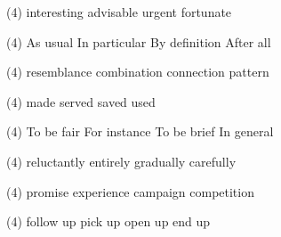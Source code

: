 \begin{tasks}(4)
	\task interesting
	\task advisable
	\task urgent
	\task fortunate
\end{tasks}
\item
\begin{tasks}(4)
	\task As usual
	\task In particular
	\task By definition
	\task After all
\end{tasks}
\item
\begin{tasks}(4)
	\task resemblance
	\task combination
	\task connection
	\task pattern
\end{tasks}
\item
\begin{tasks}(4)
	\task made
	\task served
	\task saved
	\task used
\end{tasks}
\item
\begin{tasks}(4)
	\task To be fair
	\task For instance
	\task To be brief
	\task In general
\end{tasks}
\item
\begin{tasks}(4)
	\task reluctantly
	\task entirely
	\task gradually
	\task carefully
\end{tasks}
\item
\begin{tasks}(4)
	\task promise
	\task experience
	\task campaign
	\task competition
\end{tasks}
\item
\begin{tasks}(4)
	\task follow up
	\task pick up
	\task open up
	\task end up
\end{tasks}